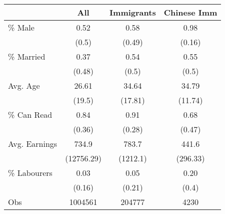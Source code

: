 \begin{tabular}{lccc}
  \hline
 & All & Immigrants & Chinese Imm \\ 
  \hline
\% Male & 0.52 & 0.58 & 0.98 \\ 
   & (0.5) & (0.49) & (0.16) \\ 
  \% Married & 0.37 & 0.54 & 0.55 \\ 
    & (0.48) & (0.5) & (0.5) \\ 
  Avg. Age & 26.61 & 34.64 & 34.79 \\ 
     & (19.5) & (17.81) & (11.74) \\ 
  \% Can Read & 0.84 & 0.91 & 0.68 \\ 
      & (0.36) & (0.28) & (0.47) \\ 
  Avg. Earnings & 734.9 & 783.7 & 441.6 \\ 
       & (12756.29) & (1212.1) & (296.33) \\ 
  \% Labourers & 0.03 & 0.05 & 0.20 \\ 
        & (0.16) & (0.21) & (0.4) \\ 
   \hline
Obs & 1004561 &  204777 &    4230 \\ 
   \hline
\end{tabular}
